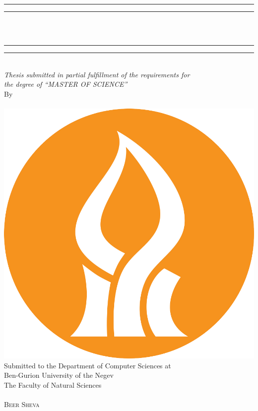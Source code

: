 \begin{center}
\vspace*{2mm}
\rule[0.5ex]{\linewidth}{2pt}\vspace*{-\baselineskip}\vspace*{3.2pt}
\rule[0.5ex]{\linewidth}{1pt}\\
[\baselineskip]{\Huge \thesisTitle}\\[3mm]
\rule[0.5ex]{\linewidth}{1pt}\vspace*{-\baselineskip}\vspace{3.2pt}
\rule[0.5ex]{\linewidth}{2pt}\\
[9mm]
{\large \textit{Thesis submitted in partial fulfillment of the requirements for\\ [2mm]
    the degree of \enquote{MASTER OF SCIENCE}
}}\\ [2mm]
\vspace{8mm}
{\large By}\\
\vspace{2.5mm}
{\large\textsc{\thesisAuthor}}\\
\vspace{10mm}
\includegraphics[scale=0.38]{01Cover/Images/logoBGU.pdf}\\
\vspace{9mm}
{\large Submitted to the Department of Computer Sciences at\\Ben-Gurion University
of the Negev\\The Faculty of Natural Sciences
}\\
\vspace{5em}
{\large\textsc{}}\\
\vspace{2em}
{\large\textsc{Beer Sheva}}
\end{center}
\thispagestyle{empty} %
\cleardoubleoddemptypage

